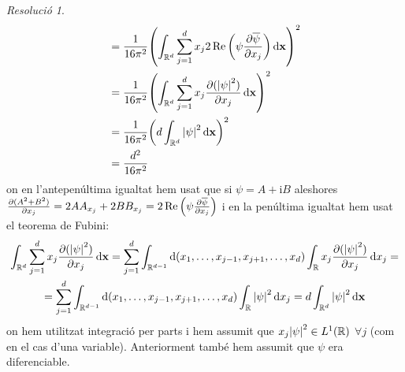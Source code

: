 \documentclass[10pt,a4paper]{article}
\newcommand{\RR}{\ensuremath{\mathbb{R}}} %
\newcommand{\vf}[1]{\boldsymbol{\mathrm{#1}}} %
\newcommand{\ii}{\mathrm{i}} %
\theoremstyle{definition}
\theoremstyle{remark}
\newtheorem*{res}{Resolució}
\begin{document}
\begin{res}
\begin{align*}
                                                                                                                                                 & = \frac{1}{16\pi^2}{\left(\int_{\RR^d}  \sum_{j=1}^dx_j2\Re\left(\psi\pdv{\overline\psi}{x_j}\right)\dd{\vf{x}}\right)}^2                                               \\                                                                                                                & = \frac{1}{16\pi^2}{\left(\int_{\RR^d}\sum_{j=1}^{d}x_j\pdv{(\abs{\psi}^2)}{x_j}\dd{\vf{x}}\right)}^2    \\
                                                                                                                                                 & = \frac{1}{16\pi^2}{\left(d\int_{\RR^d}\abs{\psi}^2\dd{\vf{x}}\right)}^2                                                                                                \\
                                                                                                                                                 & = \frac{d^2}{16\pi^2}
  \end{align*}
  on en l'antepenúltima igualtat hem usat que si $\psi=A+\ii B$ aleshores $\pdv{(A^2+B^2)}{x_j}=2AA_{x_j}+2BB_{x_j}=2\Re\left(\psi\pdv{\overline\psi}{x_j}\right)$ i en la penúltima igualtat hem usat el teorema de Fubini:
  \begin{multline*}
    \int_{\RR^d}\sum_{j=1}^{d}x_j\pdv{(\abs{\psi}^2)}{x_j}\dd{\vf{x}}=\sum_{j=1}^{d}\int_{\RR^{d-1}}\dd{(x_1,\ldots,x_{j-1},x_{j+1},\ldots,x_d)}\int_{\RR} x_j\pdv{(\abs{\psi}^2)}{x_j}\dd{x_j}=\\=\sum_{j=1}^{d}\int_{\RR^{d-1}}\dd{(x_1,\ldots,x_{j-1},x_{j+1},\ldots,x_d)}\int_{\RR} \abs{\psi}^2\dd{x_j}=d\int_{\RR^d}\abs{\psi}^2\dd{\vf{x}}
  \end{multline*}
  on hem utilitzat integració per parts i hem assumit que $x_j\abs{\psi}^2\in L^1(\RR)$ $\forall j$ (com en el cas d'una variable). Anteriorment també hem assumit que $\psi$ era diferenciable.
\end{res}
\end{document}
